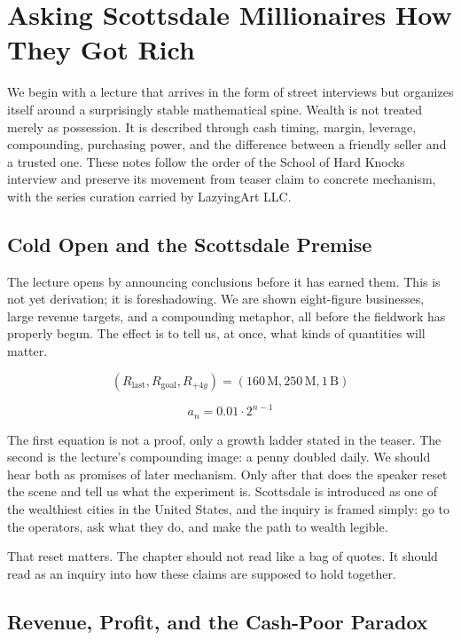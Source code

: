 \chapter{Asking Scottsdale Millionaires How They Got Rich}

We begin with a lecture that arrives in the form of street interviews but organizes itself around a surprisingly stable mathematical spine. Wealth is not treated merely as possession. It is described through cash timing, margin, leverage, compounding, purchasing power, and the difference between a friendly seller and a trusted one. These notes follow the order of the School of Hard Knocks interview and preserve its movement from teaser claim to concrete mechanism, with the series curation carried by LazyingArt LLC.

\section{Cold Open and the Scottsdale Premise}

The lecture opens by announcing conclusions before it has earned them. This is not yet derivation; it is foreshadowing. We are shown eight-figure businesses, large revenue targets, and a compounding metaphor, all before the fieldwork has properly begun. The effect is to tell us, at once, what kinds of quantities will matter.

\begin{equation}
(R_{\text{last}},R_{\text{goal}},R_{+4y}) = (160\,\text{M}, 250\,\text{M}, 1\,\text{B})
\end{equation}

\begin{equation}
a_n = 0.01 \cdot 2^{n-1}
\end{equation}

The first equation is not a proof, only a growth ladder stated in the teaser. The second is the lecture's compounding image: a penny doubled daily. We should hear both as promises of later mechanism. Only after that does the speaker reset the scene and tell us what the experiment is. Scottsdale is introduced as one of the wealthiest cities in the United States, and the inquiry is framed simply: go to the operators, ask what they do, and make the path to wealth legible.

That reset matters. The chapter should not read like a bag of quotes. It should read as an inquiry into how these claims are supposed to hold together.

\section{Revenue, Profit, and the Cash-Poor Paradox}

